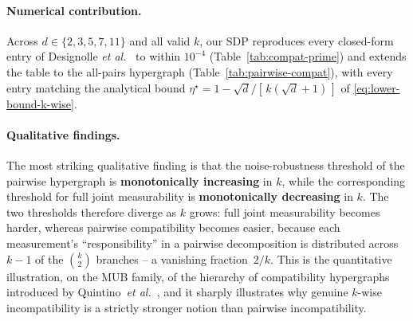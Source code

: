 \documentclass[oneside, a4paper, onecolumn, 11pt]{article}
\theoremstyle{definition}
\theoremstyle{plain}
\theoremstyle{remark}
\begin{document}
\paragraph{Numerical contribution.}
Across $d \in \{2, 3, 5, 7, 11\}$ and all valid $k$, our SDP
reproduces every closed-form entry of Designolle
\emph{et al.}~\cite{Designolle2019} to within $10^{-4}$ (Table~\ref{tab:compat-prime})
and extends the table to the all-pairs hypergraph
(Table~\ref{tab:pairwise-compat}), with every entry matching the
analytical bound $\eta^{\star} = 1 - \sqrt{d}/[\,k(\sqrt{d}+1)\,]$
of \eqref{eq:lower-bound-k-wise}.

\paragraph{Qualitative findings.}
The most striking qualitative finding is that the noise-robustness
threshold of the pairwise hypergraph is \textbf{monotonically increasing}
in $k$, while the corresponding threshold for full joint measurability
is \textbf{monotonically decreasing} in $k$. The two thresholds therefore
diverge as $k$ grows: full joint measurability becomes harder, whereas
pairwise compatibility becomes easier, because each measurement's
``responsibility'' in a pairwise decomposition is distributed across
$k-1$ of the $\binom{k}{2}$ branches -- a vanishing fraction~$2/k$.
This is the quantitative illustration, on the MUB family, of the
hierarchy of compatibility hypergraphs introduced by
Quintino~\emph{et al.}~\cite{Quintino2019}, and it sharply illustrates
why genuine $k$-wise incompatibility is a strictly stronger notion than
pairwise incompatibility.
\end{document}
